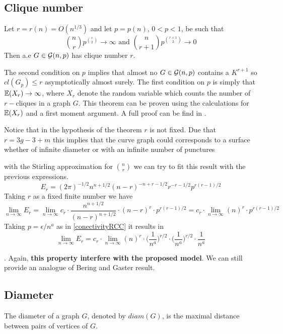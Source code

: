 \subsection{Clique number}

\begin{theorem}
Let $r = r(n) = O(n^{1/3})$ and let $p=p(n)$, $0<p<1$, be such that
$$\binom{n}{r} p^{\binom{r}{2}} \to \infty \text{ and } \binom{n}{r+1} p^{\binom{r+1}{2}} \to 0 $$
Then a.e $G\in\mathcal{G}(n,p)$ has clique number $r$.
\end{theorem}

The second condition on $p$ implies that almost no $G\in\mathcal{G}(n,p)$ contains a $K^{r+1}$ so $cl(G_{p})\leq r$ asymptotically almost surely. The first condition on $p$ is simply that $\mathbb{E} (X_{r}) \to  \infty$, where $X_r$ denote the random variable which counts the number of $r-$cliques in a graph $G$. This theorem can be proven using the calculations for $\mathbb{E}(X_{r})$ and a first moment argument. A full proof can be find in \cite[Bollobás, p.~290]{Bollobas}.

Notice that in the hypothesis of the theorem $r$ is not fixed. Due that $r=3g-3+m$ this implies that the curve graph could corresponds to a surface whether of infinite diameter or with an infinite number of punctures

with the Stirling approximation for $\binom{n}{r}$ we can try to fit this result with the previous expressions.
$$E_{r} = (2\pi)^{- 1/2} n^{n+ 1/2} (n - r)^{-n+r-1/2} r^{-r-1/2} p^{r(r- 1)/2}$$
Taking $r$ as a fixed finite number we have
$$\displaystyle\lim_{n\to \infty } E_{r} = \displaystyle\lim_{n\to \infty} c_{r}\cdot \frac{n^{n+1/2}}{(n-r)^{n+1/2}} \cdot (n-r)^{r}\cdot p^{r(r-1)/2} = c_{r}\cdot \displaystyle\lim_{n\to \infty}  (n)^{r}\cdot p^{r(r-1)/2}$$
Taking $p=\epsilon/n^{a}$ as in \ref{conectivityRCC} it results in
$$\displaystyle\lim_{n\to \infty } E_{r} =  c_{r}\cdot \displaystyle\lim_{n\to \infty}  (n)^{r}\cdot\Big(\frac{1}{n^a}\Big)^{r/2}\cdot \Big(\frac{1}{n^a}\Big)^{r/2}
\cdot\frac{1}{n^a}$$



. Again, \textbf{this property interfere with the proposed model}. We can still provide an analogue of Bering and Gaster result.

\subsection{Diameter}

The diameter of a graph $G$, denoted by $diam(G)$, is the maximal distance between pairs of vertices of $G$.

